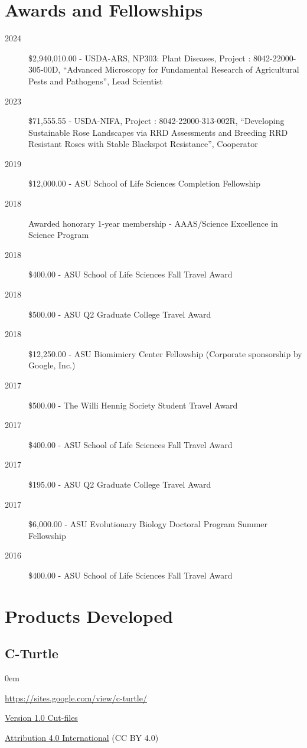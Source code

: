 \documentclass[12pt,a4paper]{article}
\begin{document}
\section*{Awards and Fellowships}
\begin{description}
	\item [2024] \$2,940,010.00 - USDA-ARS, NP303: Plant Diseases, Project \textnumero: 8042-22000-305-00D, ``Advanced Microscopy for Fundamental Research of Agricultural Pests and Pathogens'', Lead Scientist
	\item [2023] \$71,555.55 - USDA-NIFA, Project \textnumero: 8042-22000-313-002R, ``Developing Sustainable Rose Landscapes via RRD Assessments and Breeding RRD Resistant Roses with Stable Blackspot Resistance'', Cooperator
	\item [2019] \$12,000.00 - ASU School of Life Sciences Completion Fellowship
	\item [2018] Awarded honorary 1-year membership - AAAS/Science Excellence in Science Program
	\item [2018] \$400.00 - ASU School of Life Sciences Fall Travel Award
	\item [2018] \$500.00 - ASU Q2 Graduate College Travel Award
	\item [2018] \$12,250.00 - ASU Biomimicry Center Fellowship (Corporate sponsorship by Google, Inc.)
	\item [2017] \$500.00 - The Willi Hennig Society Student Travel Award
	\item [2017] \$400.00 - ASU School of Life Sciences Fall Travel Award
	\item [2017] \$195.00 - ASU Q2 Graduate College Travel Award
	\item [2017] \$6,000.00 - ASU Evolutionary Biology Doctoral Program Summer Fellowship
	\item [2016] \$400.00 - ASU School of Life Sciences Fall Travel Award
\end{description}

\section*{Products Developed}
\subsection*{C-Turtle}
\begin{description}
	\itemsep0em
	\item[Website] \href{https://sites.google.com/view/c-turtle/}{https://sites.google.com/view/c-turtle/}
	\item[Design] \href{https://drive.google.com/file/d/0BxntR7XVPIVqekR3Sjcyd1hkUm8/view}{Version 1.0 Cut-files}
	\item[License] \href{https://creativecommons.org/licenses/by/4.0/}{Attribution 4.0 International} (CC BY 4.0)
\end{description}
\end{document}
